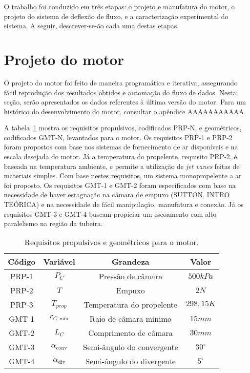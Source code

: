 
O trabalho foi conduzido em três etapas: o projeto e manufatura do motor, o projeto do sistema de deflexão de fluxo, e a caracterização experimental do sistema. A seguir, descrever-se-ão cada uma destas etapas.

\section{Projeto do motor}

O projeto do motor foi feito de maneira programática e iterativa, assegurando fácil reprodução dos resultados obtidos e automação do fluxo de dados. Nesta seção, serão apresentados os dados referentes à última versão do motor. Para um histórico do desenvolvimento do motor, consultar o apêndice AAAAAAAAAAA. 

A tabela~\ref{tab:requirements} mostra os requisitos propulsivos, codificados PRP-N, e geométricos, codificados GMT-N, levantados para o motor. Os requisitos PRP-1 e PRP-2 foram propostos com base nos sistemas de fornecimento de ar disponíveis e na escala desejada do motor. Já a temperatura do propelente, requisito PRP-2, é baseada na temperatura ambiente, e permite a utilização de \textit{jet vanes} feitas de materiais simples. Com base nestes requisitos, um sistema monopropelente a ar foi proposto. Os requisitos GMT-1 e GMT-2 foram especificados com base na necessidade de haver estagnação na câmara de empuxo (SUTTON, INTRO TEÓRICA) e na necessidade de fácil manipulação, manufatura e conexão. Já os requisitos GMT-3 e GMT-4 buscam propiciar um escoamento com alto paralelismo na região da tubeira.

\begin{table}[]
    \centering\begin{tabular}{cccc} \toprule
        Código & Variável & Grandeza & Valor \\ \midrule
        PRP-1 & \(P_C\) & Pressão de câmara & \(500kPa\) \\
        PRP-2 & \(T\) & Empuxo & \(2N\) \\
        PRP-3 &\(T_{prop}\) & Temperatura do propelente & \(298,15K\) \\
        GMT-1 & \(r_{C,\text{min}}\) & Raio de câmara mínimo & \(15mm\) \\
        GMT-2 & \(L_C\) & Comprimento de câmara & \(30mm\) \\
        GMT-3 & \(\alpha_{\text{conv}}\) & Semi-ângulo do convergente & \(30^\circ \) \\
        GMT-4 & \(\alpha_{\text{div}}\) & Semi-ângulo do divergente & \(5^\circ \) \\ \bottomrule 
    \end{tabular}
    \caption{Requisitos propulsivos e geométricos para o motor.}
    \label{tab:requirements}
\end{table}

